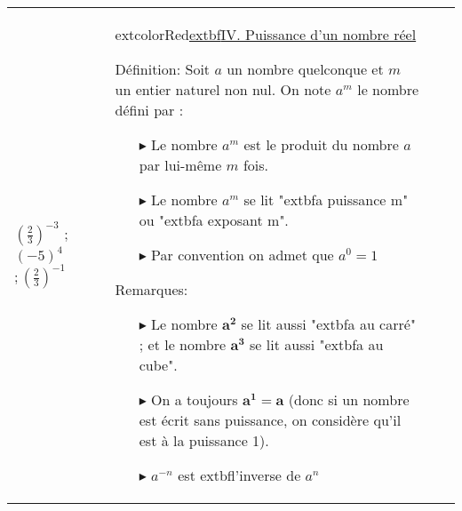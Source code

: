 \documentclass[11pt,a4paper,landscape]{article}
\begin{document}
\begin{longtable}{|>{\centering\arraybackslash}p{3cm}|>{\raggedright\arraybackslash}p{5cm}|>{\raggedright\arraybackslash}p{13.5cm}|>{\raggedright\arraybackslash}p{5cm}|}
$\left ( \frac 23\right ) ^{- 3}$ ; $\left ( - 5\right ) ^4$ $; \left ( \frac 23\right ) ^{- 1}$
&	
extcolor{Red}{\uline{\sffamily extbf{IV. Puissance d’un nombre réel} }}\par
\begin{BoxRafa}[colbacktitle = green]{Définition:}
Soit $a$ un nombre quelconque et $m$ un entier naturel non nul. On note   $a^m$ le nombre défini par : %

\hspace*{3cm}\begin{tikzpicture}[
roundnode/.style={circle, draw=green!60, fill=green!5, very thick, minimum size=7mm},
squarednode/.style={rectangle, draw=red!60, fill=red!5, very thick, minimum size=5mm},
]
node[squarednode](maintopic){$a^m=\underbrace{aimes aimes\cdotsimes a}_{m\ fois}$};

\end{tikzpicture}\vspace{-.3cm}
\begin{itemize}
\item[$\blacktriangleright$]  Le nombre $a^m$ est le produit du nombre $a$ par lui-même $m$ fois.
\item[$\blacktriangleright$]  Le nombre $a^m$ se lit "extbf{a puissance m}" ou "extbf{a exposant m}".
\item[$\blacktriangleright$]  Par convention on admet que $a^0=1$
\end{itemize}
\end{BoxRafa}
\begin{BoxRafa}[colbacktitle = Orange]{Remarques:}

\begin{itemize}
\item[$\blacktriangleright$]  Le nombre $\mathbf{a^{2}}$ se lit aussi "extbf{a au carré}" ; et le nombre $\mathbf{a^{3}}$ se lit aussi "extbf{a au cube}".
\item[$\blacktriangleright$]  On a toujours $\mathbf{a^{1}=a}$ (donc si un nombre est écrit sans puissance, on considère qu’il est à la puissance 1).
\item[$\blacktriangleright$]  $a^{-n}$ est extbf{l’inverse} de $a^{n}$
\end{itemize}


\end{BoxRafa}
\end{longtable}
\end{document}
